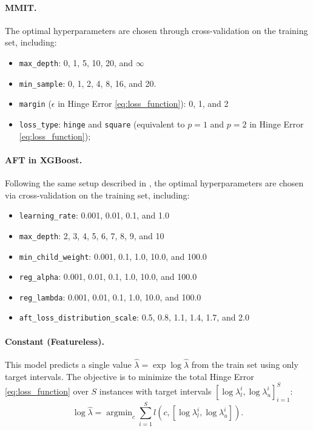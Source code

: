 \documentclass[12pt]{article}
\DeclareMathOperator*{\argmin}{argmin}
\begin{document}
\paragraph{MMIT.}  The optimal hyperparameters are chosen through cross-validation on the training set, including:
\begin{itemize}
    \item \texttt{max\_depth}:  0, 1, 5, 10, 20, and $\infty$
    \item \texttt{min\_sample}:  0, 1, 2, 4, 8, 16, and 20. 
    \item \texttt{margin} ($\epsilon$ in Hinge Error \ref{eq:loss_function}):  0, 1, and 2
    \item \texttt{loss\_type}:  \texttt{hinge} and \texttt{square} (equivalent to $p=1$ and $p=2$ in Hinge Error \ref{eq:loss_function});
\end{itemize}

\paragraph{AFT in XGBoost.} Following the same setup described in \citet{aft_xgboost}, the optimal hyperparameters are chosen via cross-validation on the training set, including:
\begin{itemize}
    \item \texttt{learning\_rate}: 0.001, 0.01, 0.1, and 1.0
    \item \texttt{max\_depth}: 2, 3, 4, 5, 6, 7, 8, 9, and 10
    \item \texttt{min\_child\_weight}: 0.001, 0.1, 1.0, 10.0, and 100.0
    \item \texttt{reg\_alpha}: 0.001, 0.01, 0.1, 1.0, 10.0, and 100.0
    \item \texttt{reg\_lambda}: 0.001, 0.01, 0.1, 1.0, 10.0, and 100.0
    \item \texttt{aft\_loss\_distribution\_scale}: 0.5, 0.8, 1.1, 1.4, 1.7, and 2.0
\end{itemize}

\paragraph{Constant (Featureless).} 
This model predicts a single value $\hat{\lambda} = \exp{\log\hat{\lambda}}$ from the train set using only target intervals.
The objective is to minimize the total Hinge Error \eqref{eq:loss_function} over $ S $ instances with target intervals $[\log\lambda_l^i, \log\lambda_u^i]_{i=1}^S$:  
\begin{equation*}
\log\hat{\lambda} = \argmin_{c} \sum_{i=1}^{S} l(c, [\log\lambda_l^i, \log\lambda_u^i]).
\end{equation*}
\end{document}
